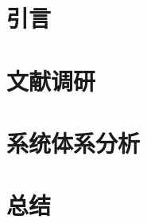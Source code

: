 \documentclass[12pt,hyperref,a4paper,UTF8]{ctexart}
\begin{document}
\cover

%
%

\thispagestyle{empty} %

\newpage
\tableofcontents

\newpage


\section{引言}

\section{文献调研}

\section{系统体系分析}

%
%
\section{总结}

\newpage


\end{document}
